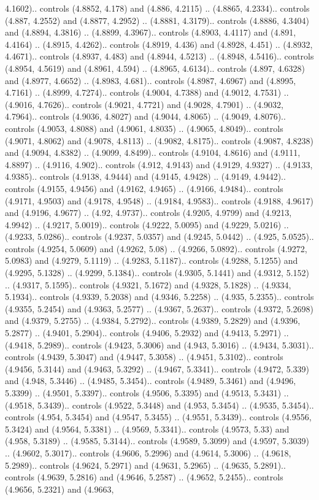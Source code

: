 4.1602).. controls (4.8852, 4.178) and (4.886, 4.2115) .. (4.8865, 4.2334).. controls (4.887, 4.2552) and (4.8877, 4.2952) .. (4.8881, 4.3179).. controls (4.8886, 4.3404) and (4.8894, 4.3816) .. (4.8899, 4.3967).. controls (4.8903, 4.4117) and (4.891, 4.4164) .. (4.8915, 4.4262).. controls (4.8919, 4.436) and (4.8928, 4.451) .. (4.8932, 4.4671).. controls (4.8937, 4.483) and (4.8944, 4.5213) .. (4.8948, 4.5416).. controls (4.8954, 4.5619) and (4.8961, 4.594) .. (4.8965, 4.6134).. controls (4.897, 4.6328) and (4.8977, 4.6652) .. (4.8983, 4.681).. controls (4.8987, 4.6967) and (4.8995, 4.7161) .. (4.8999, 4.7274).. controls (4.9004, 4.7388) and (4.9012, 4.7531) .. (4.9016, 4.7626).. controls (4.9021, 4.7721) and (4.9028, 4.7901) .. (4.9032, 4.7964).. controls (4.9036, 4.8027) and (4.9044, 4.8065) .. (4.9049, 4.8076).. controls (4.9053, 4.8088) and (4.9061, 4.8035) .. (4.9065, 4.8049).. controls (4.9071, 4.8062) and (4.9078, 4.8113) .. (4.9082, 4.8175).. controls (4.9087, 4.8238) and (4.9094, 4.8382) .. (4.9099, 4.8499).. controls (4.9104, 4.8616) and (4.9111, 4.8897) .. (4.9116, 4.902).. controls (4.912, 4.9143) and (4.9129, 4.9327) .. (4.9133, 4.9385).. controls (4.9138, 4.9444) and (4.9145, 4.9428) .. (4.9149, 4.9442).. controls (4.9155, 4.9456) and (4.9162, 4.9465) .. (4.9166, 4.9484).. controls (4.9171, 4.9503) and (4.9178, 4.9548) .. (4.9184, 4.9583).. controls (4.9188, 4.9617) and (4.9196, 4.9677) .. (4.92, 4.9737).. controls (4.9205, 4.9799) and (4.9213, 4.9942) .. (4.9217, 5.0019).. controls (4.9222, 5.0095) and (4.9229, 5.0216) .. (4.9233, 5.0286).. controls (4.9237, 5.0357) and (4.9245, 5.0442) .. (4.925, 5.0525).. controls (4.9254, 5.0609) and (4.9262, 5.08) .. (4.9266, 5.0892).. controls (4.9272, 5.0983) and (4.9279, 5.1119) .. (4.9283, 5.1187).. controls (4.9288, 5.1255) and (4.9295, 5.1328) .. (4.9299, 5.1384).. controls (4.9305, 5.1441) and (4.9312, 5.152) .. (4.9317, 5.1595).. controls (4.9321, 5.1672) and (4.9328, 5.1828) .. (4.9334, 5.1934).. controls (4.9339, 5.2038) and (4.9346, 5.2258) .. (4.935, 5.2355).. controls (4.9355, 5.2454) and (4.9363, 5.2577) .. (4.9367, 5.2637).. controls (4.9372, 5.2698) and (4.9379, 5.2755) .. (4.9384, 5.2792).. controls (4.9389, 5.2829) and (4.9396, 5.2877) .. (4.9401, 5.2904).. controls (4.9406, 5.2932) and (4.9413, 5.2971) .. (4.9418, 5.2989).. controls (4.9423, 5.3006) and (4.943, 5.3016) .. (4.9434, 5.3031).. controls (4.9439, 5.3047) and (4.9447, 5.3058) .. (4.9451, 5.3102).. controls (4.9456, 5.3144) and (4.9463, 5.3292) .. (4.9467, 5.3341).. controls (4.9472, 5.339) and (4.948, 5.3446) .. (4.9485, 5.3454).. controls (4.9489, 5.3461) and (4.9496, 5.3399) .. (4.9501, 5.3397).. controls (4.9506, 5.3395) and (4.9513, 5.3431) .. (4.9518, 5.3439).. controls (4.9522, 5.3448) and (4.953, 5.3454) .. (4.9535, 5.3454).. controls (4.954, 5.3454) and (4.9547, 5.3455) .. (4.9551, 5.3439).. controls (4.9556, 5.3424) and (4.9564, 5.3381) .. (4.9569, 5.3341).. controls (4.9573, 5.33) and (4.958, 5.3189) .. (4.9585, 5.3144).. controls (4.9589, 5.3099) and (4.9597, 5.3039) .. (4.9602, 5.3017).. controls (4.9606, 5.2996) and (4.9614, 5.3006) .. (4.9618, 5.2989).. controls (4.9624, 5.2971) and (4.9631, 5.2965) .. (4.9635, 5.2891).. controls (4.9639, 5.2816) and (4.9646, 5.2587) .. (4.9652, 5.2455).. controls (4.9656, 5.2321) and (4.9663, 